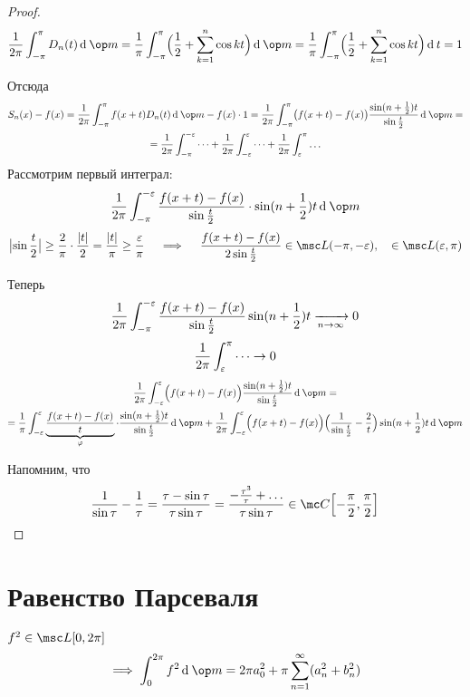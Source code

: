 \begin{proof}
	$$ \frac1{2\pi} \int_{-\pi}^\pi D_n(t) \di \op m = \frac1 \pi \int_{-\pi}^\pi \Bigl( \frac12 + \sum_{k = 1}^n \cos kt \Bigr) \di \op m = \frac1 \pi \int_{-\pi}^\pi \Bigl( \frac12 + \sum_{k = 1}^n \cos kt \Bigr) \di t = 1 $$

	Отсюда
	\begin{multline*}
		S_n(x) - f(x) =
		\frac1{2\pi} \int_{-\pi}^\pi f(x + t) D_n(t) \di \op m - f(x) \cdot 1 =
		\frac1{2\pi} \int_{-\pi}^\pi \bigl( f(x + t) - f(x) \bigr) \frac{\sin(n + \frac12)t}{\sin \frac t2} \di \op m = \\
		= \frac1{2\pi} \int_{-\pi}^{-\eps} \dots + \frac1{2\pi} \int_{-\eps}^\eps \dots + \frac1{2\pi} \int_\eps^\pi \dots
	\end{multline*}
	Рассмотрим первый интеграл:
	$$ \frac1{2\pi} \int_{-\pi}^{-\eps} \frac{f(x + t) - f(x)}{\sin \frac t2} \cdot \sin (n + \frac12)t \di \op m $$
	$$ \bigl| \sin \frac t2 \bigr| \ge \frac 2\pi \cdot \frac{|t|}2 = \frac{|t|}\pi \ge \frac \eps \pi \quad \implies \quad \frac{f(x + t) - f(x)}{2 \sin \frac t2} \in \msc L(-\pi, -\eps), \quad \in \msc L(\eps, \pi) $$

	Теперь
	$$ \frac1{2\pi} \int_{-\pi}^{-\varepsilon} \frac{f(x + t) - f(x)}{\sin \frac t2} \sin(n + \frac12)t \xrightarrow[n \to \infty]{} 0 $$
	$$ \frac1{2\pi} \int_\varepsilon^\pi \dots \to 0 $$
	\begin{multline*}
		\frac1{2\pi} \int_{-\eps}^\eps \Bigl( f(x + t) - f(x) \Bigr) \frac{\sin(n + \frac12)t}{\sin \frac t2} \di \op m = \\
		= \frac1 \pi \int_{-\eps}^\eps \underbrace{\frac{f(x + t) - f(x)}t}_\phi \cdot \frac{\sin (n + \frac12) t}{\sin \frac t2} \di \op m + \frac1{2\pi} \int_{-\eps}^\eps \Bigl( f(x + t) - f(x) \Bigr) \Bigl( \frac1{\sin \frac t2} - \frac 2t \Bigr) \sin(n + \frac12)t \di \op m
	\end{multline*}

	Напомним, что
	$$ \frac1{\sin \tau} - \frac1\tau = \frac{\tau - \sin \tau}{\tau \sin \tau} = \frac{-\frac{\tau^3}\tau + \dots}{\tau \sin \tau} \in \mc C \Bigl[ -\frac\pi 2, \frac\pi2 \Bigr] $$
\end{proof}

\section{Равенство Парсеваля}

\begin{theorem}
	$ f^2 \in \msc L[0, 2\pi] $
	$$ \implies \int_0^{2\pi} f^2 \di \op m = 2 \pi a_0^2 + \pi \sum_{n = 1}^\infty (a_n^2 + b_n^2) $$
\end{theorem}

